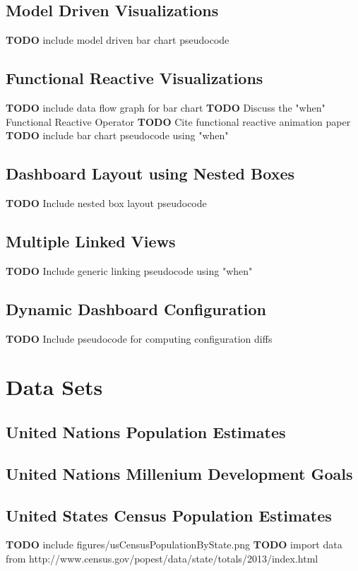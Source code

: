 \documentclass[12pt]{article}
\newcommand{\TODO}[1]{{ \color{red}\textbf{TODO} #1 }}
\begin{document}
\begin{doublespace}
\subsection{Model Driven Visualizations}
\TODO{ include model driven bar chart pseudocode}
\subsection{Functional Reactive Visualizations}
\TODO{ include data flow graph for bar chart}
\TODO { Discuss the "when" Functional Reactive Operator}
\TODO { Cite functional reactive animation paper}
\TODO{ include bar chart pseudocode using "when"}
\subsection{Dashboard Layout using Nested Boxes}
\TODO{Include nested box layout pseudocode}
\subsection{Multiple Linked Views}
\TODO{Include generic linking pseudocode using "when"}
\subsection{Dynamic Dashboard Configuration}
\TODO{Include pseudocode for computing configuration diffs}

\pagebreak
\section{Data Sets}
\subsection{United Nations Population Estimates}
\subsection{United Nations Millenium Development Goals}
\subsection{United States Census Population Estimates}
\TODO{ include figures/usCensusPopulationByState.png}
\TODO{ import data from http://www.census.gov/popest/data/state/totals/2013/index.html}

\end{doublespace}
\end{document}
